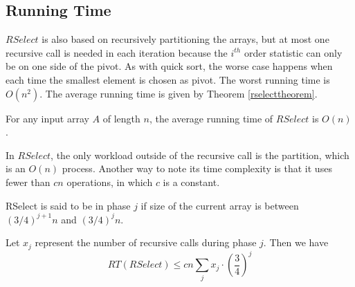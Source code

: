 \subsection{Running Time}
$RSelect$ is also based on recursively partitioning the arrays, but at most one recursive call is needed in each iteration because the $i^{th}$ order statistic can only be on one side of the pivot. As with quick sort, the worse case happens when each time the smallest element is chosen as pivot. The worst running time is $O(n^2)$. The average running time is given by Theorem \ref{rselecttheorem}.
\begin{theorem}\label{rselecttheorem}
For any input array $A$ of length $n$, the average running time of $RSelect$ is $O(n)$.
\end{theorem}
In $RSelect$, the only workload outside of the recursive call is the partition, which is an $O(n)$ process. Another way to note its time complexity is that it uses fewer than $cn$ operations, in which $c$ is a constant. 
\begin{definition}
RSelect is said to be in phase $j$ if size of the current array is between $(3/4)^{j+1}n$ and $(3/4)^jn$.
\end{definition}
Let $x_j$ represent the number of recursive calls during phase $j$. Then we have 
$$RT(RSelect)\leq cn\sum\limits_jx_j\cdot\left(\frac{3}{4}\right)^j$$
\ifx\PREAMBLE\undefined

\fi